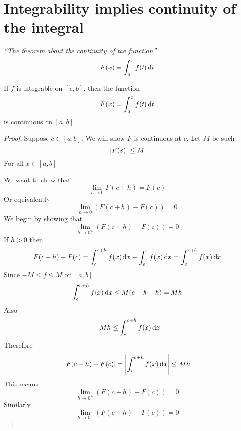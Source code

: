 \documentclass[12pt]{report}
\begin{document}
    \section{Integrability implies continuity of the integral}
    \textit{``The theorem about the continuity of the function''}
    \[F(x) = \int^x_a f(t) \, \mathrm{d} t\]
    \begin{theorem}
        If \(f\) is integrable on \([a,b]\), then the function 
        \[F(x) = \int^x_a f(t) \, \mathrm{d} t\]
        is continuous on \([a,b]\)
    \end{theorem}
    \begin{proof}
        Suppose \(c \in [a,b]\). We will show \(F\) is continuous at \(c\). Let \(M\) be such 
        \[\left| F(x) \right| \leq M\]
        For all \(x \in [a,b]\)

        We want to show that 
        \[\lim_{h \to 0} F(c+h) = F(c)\]
        Or equivalently 
        \[\lim_{h \to 0} \left(F(c+h) - F(c) \right)= 0\]
        We begin by showing that 
        \[\lim_{h \to 0^+} \left(F(c+h) - F(c)\right)= 0\]
        If \(h >0\) then
        \[F(c+h) - F(c) = \int^{c+h}_a f(x) \, \mathrm{d} x - \int^{c}_a f(x) \, \mathrm{d} x = \int^{c+h}_c f(x) \, \mathrm{d} x\]
        Since \(-M \leq f \leq M\) on \([a,b]\)
        \[\int^{c+h}_c f(x) \, \mathrm{d} x \leq M(c+h-h) = Mh\]
        Also
        \[-Mh \leq \int^{c+h}_c f(x) \, \mathrm{d} x\]
        Therefore
        \[\left| F(c+h) - F(c) \right| = \left| \int^{c+h}_c f(x) \, \mathrm{d} x \right| \leq Mh\]
        This means
        \[\lim_{h \to 0^+} \left(F(c+h) - F(c) \right)= 0\]
        Similarly
        \[\lim_{h \to 0^-} \left(F(c+h) - F(c) \right)= 0\]
    \end{proof} \newpage
\end{document}
